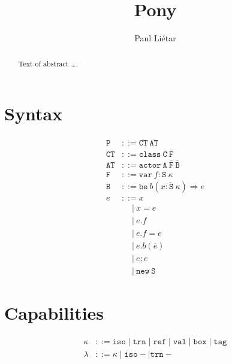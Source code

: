 \documentclass[format=acmsmall, authordraft, authorversion]{acmart}\settopmatter{printfolios=true,printccs=false,printacmref=false}
\newcommand{\seq}[1]{\overline{#1}}
\begin{document}
\title{Pony}
\author{Paul Li\'etar}

\begin{abstract}
Text of abstract \ldots.
\end{abstract}

\maketitle

\section{Syntax}

\begin{align*}
\mathtt{P} &::= \seq{\mathtt{CT}}\ \seq{\mathtt{AT}}\\
\mathtt{CT} &::= \mathtt{class}\ \mathtt{C}\ \seq{\mathtt{F}}\\
\mathtt{AT} &::= \mathtt{actor}\ \mathtt{A}\ \seq{\mathtt{F}}\ \seq{\mathtt{B}}\\
\mathtt{F} &::= \mathtt{var}\ f : \mathtt{S}\ \kappa\\
\mathtt{B} &::= \mathtt{be}\ b(\seq{x: \mathtt{S}\ \kappa}) \Rightarrow e\\
e &::= x \\
&\quad ~|~ x = e \\
&\quad ~|~ e.f \\
&\quad ~|~ e.f = e \\
&\quad ~|~ e.b(\seq{e}) \\
&\quad ~|~ e ; e\\
&\quad ~|~ \mathtt{new}\ \mathtt{S}
\end{align*}

\section{Capabilities}
\begin{align*}
    \kappa &::= \texttt{iso} \mid \texttt{trn} \mid \texttt{ref} \mid \texttt{val} \mid \texttt{box} \mid \texttt{tag}\\
    \lambda &::= \kappa \mid \texttt{iso}- \mid \texttt{trn}-
\end{align*}

\end{document}
